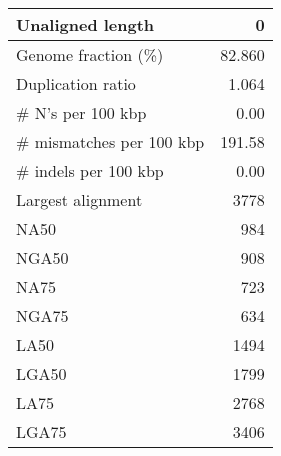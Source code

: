 \documentclass[12pt,a4paper]{article}
\begin{document}
\begin{table}[ht]
\begin{center}
\begin{tabular}{|l*{1}{|r}|}
Unaligned length & 0 \\ \hline
Genome fraction (\%) & 82.860 \\ \hline
Duplication ratio & 1.064 \\ \hline
\# N's per 100 kbp & 0.00 \\ \hline
\# mismatches per 100 kbp & 191.58 \\ \hline
\# indels per 100 kbp & 0.00 \\ \hline
Largest alignment & 3778 \\ \hline
NA50 & 984 \\ \hline
NGA50 & 908 \\ \hline
NA75 & 723 \\ \hline
NGA75 & 634 \\ \hline
LA50 & 1494 \\ \hline
LGA50 & 1799 \\ \hline
LA75 & 2768 \\ \hline
LGA75 & 3406 \\ \hline
\end{tabular}
\end{center}
\end{table}
\end{document}
